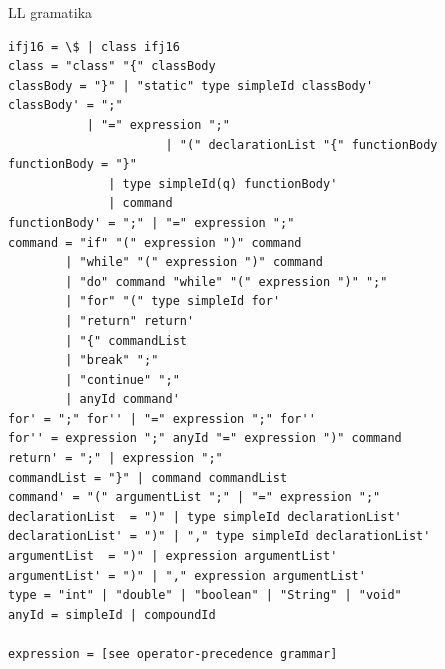 \documentclass[13pt]{beamer}
\begin{document}
\begin{frame}{LL gramatika}
\begin{lstlisting}
ifj16 = \$ | class ifj16
class = "class" "{" classBody
classBody = "}" | "static" type simpleId classBody'
classBody' = ";"
           | "=" expression ";"
                      | "(" declarationList "{" functionBody
functionBody = "}"
              | type simpleId(q) functionBody'
              | command
functionBody' = ";" | "=" expression ";"
command = "if" "(" expression ")" command
        | "while" "(" expression ")" command
        | "do" command "while" "(" expression ")" ";"
        | "for" "(" type simpleId for'
        | "return" return'
        | "{" commandList
        | "break" ";"
        | "continue" ";"
        | anyId command'
for' = ";" for'' | "=" expression ";" for''
for'' = expression ";" anyId "=" expression ")" command
return' = ";" | expression ";"
commandList = "}" | command commandList
command' = "(" argumentList ";" | "=" expression ";"
declarationList  = ")" | type simpleId declarationList'
declarationList' = ")" | "," type simpleId declarationList'
argumentList  = ")" | expression argumentList'
argumentList' = ")" | "," expression argumentList'
type = "int" | "double" | "boolean" | "String" | "void"
anyId = simpleId | compoundId

expression = [see operator-precedence grammar]
\end{lstlisting}
\end{frame}
\end{document}
